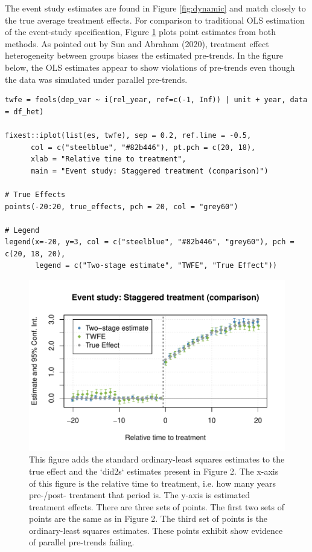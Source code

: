 The event study estimates are found in Figure \ref{fig:dynamic} and match closely to the true average treatment effects. For comparison to traditional OLS estimation of the event-study specification, Figure \ref{fig:dynamic-w-twfe} plots point estimates from both methods. As pointed out by Sun and Abraham (2020), treatment effect heterogeneity between groups biases the estimated pre-trends. In the figure below, the OLS estimates appear to show violations of pre-trends even though the data was simulated under parallel pre-trends.

\begin{verbatim}
twfe = feols(dep_var ~ i(rel_year, ref=c(-1, Inf)) | unit + year, data = df_het) 

fixest::iplot(list(es, twfe), sep = 0.2, ref.line = -0.5,
      col = c("steelblue", "#82b446"), pt.pch = c(20, 18), 
      xlab = "Relative time to treatment", 
      main = "Event study: Staggered treatment (comparison)")

# True Effects
points(-20:20, true_effects, pch = 20, col = "grey60")

# Legend
legend(x=-20, y=3, col = c("steelblue", "#82b446", "grey60"), pch = c(20, 18, 20), 
       legend = c("Two-stage estimate", "TWFE", "True Effect"))
\end{verbatim}

\begin{figure}
\includegraphics[width=1\linewidth]{RJ-2022-048_files/figure-latex/dynamic-w-twfe-1} \caption{This figure adds the standard ordinary-least squares estimates to the true effect and the `did2s` estimates present in Figure 2. The x-axis of this figure is the relative time to treatment, i.e. how many years pre-/post- treatment that period is. The y-axis is estimated treatment effects. There are three sets of points. The first two sets of points are the same as in Figure 2. The third set of points is the ordinary-least squares estimates. These points exhibit show evidence of parallel pre-trends failing.}\label{fig:dynamic-w-twfe}
\end{figure}

